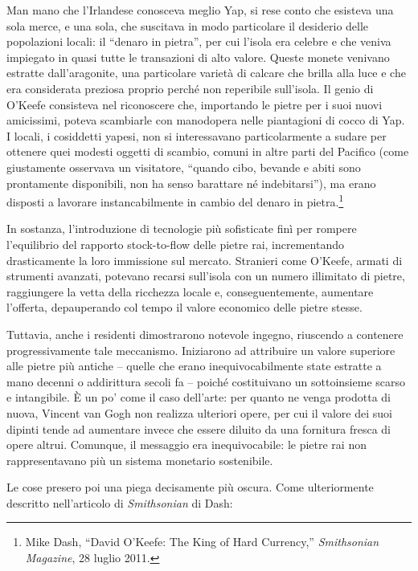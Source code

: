\documentclass[
  a5paper,
  smalldemyvopaper,10pt,twoside,onecolumn,openright,extrafontsizes,hidelinks]{memoir}
\renewenvironment{quote}%
               {\list{}{\rightmargin=.6cm\leftmargin=.6cm}%
                \itshape \item[]}%
               {\endlist}
\begin{document}
\begin{quote}
Man mano che l'Irlandese conosceva meglio Yap, si rese conto che
esisteva una sola merce, e una sola, che suscitava in modo particolare
il desiderio delle popolazioni locali: il ``denaro in pietra'', per cui
l'isola era celebre e che veniva impiegato in quasi tutte le transazioni
di alto valore. Queste monete venivano estratte dall'aragonite, una
particolare varietà di calcare che brilla alla luce e che era
considerata preziosa proprio perché non reperibile sull'isola. Il genio
di O'Keefe consisteva nel riconoscere che, importando le pietre per i
suoi nuovi amicissimi, poteva scambiarle con manodopera nelle
piantagioni di cocco di Yap. I locali, i cosiddetti yapesi, non si
interessavano particolarmente a sudare per ottenere quei modesti oggetti
di scambio, comuni in altre parti del Pacifico (come giustamente
osservava un visitatore, ``quando cibo, bevande e abiti sono prontamente
disponibili, non ha senso barattare né indebitarsi''), ma erano disposti
a lavorare instancabilmente in cambio del denaro in pietra.\footnote{Mike
  Dash, ``David O'Keefe: The King of Hard Currency,'' \emph{Smithsonian
  Magazine}, 28 luglio 2011.}
\end{quote}

In sostanza, l'introduzione di tecnologie più sofisticate finì per
rompere l'equilibrio del rapporto stock-to-flow delle pietre rai,
incrementando drasticamente la loro immissione sul mercato. Stranieri
come O'Keefe, armati di strumenti avanzati, potevano recarsi sull'isola
con un numero illimitato di pietre, raggiungere la vetta della ricchezza
locale e, conseguentemente, aumentare l'offerta, depauperando col tempo
il valore economico delle pietre stesse.

Tuttavia, anche i residenti dimostrarono notevole ingegno, riuscendo a
contenere progressivamente tale meccanismo. Iniziarono ad attribuire un
valore superiore alle pietre più antiche -- quelle che erano
inequivocabilmente state estratte a mano decenni o addirittura secoli fa
-- poiché costituivano un sottoinsieme scarso e intangibile. È un po'
come il caso dell'arte: per quanto ne venga prodotta di nuova, Vincent
van Gogh non realizza ulteriori opere, per cui il valore dei suoi
dipinti tende ad aumentare invece che essere diluito da una fornitura
fresca di opere altrui. Comunque, il messaggio era inequivocabile: le
pietre rai non rappresentavano più un sistema monetario sostenibile.

Le cose presero poi una piega decisamente più oscura. Come ulteriormente
descritto nell'articolo di \emph{Smithsonian} di Dash:
\end{document}

